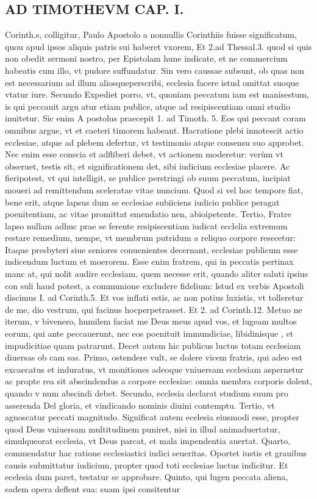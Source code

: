 \documentclass{article}
\begin{document}
\begin{pages}
\section*{AD TIMOTHEVM CAP. I. }
\marginpar{[ p.71 ]}\pstart Corinth.s, colligitur, Paulo Apostolo a nonnullis Corinthiis fuisse significatum, quou apud ipsos aliquis patris sui haberet vxorem, Et 2.ad Thessal.3. quod si quis non obedit sermoni nostro, per Epistolam hune indicate, et ne commercium habeatis cum illo, vt pudore suffundatur. Sin vero caussae subsunt, ob quas non est necessarium ad illum aliosqueperscribi, ecclesia facere istud omittat suoque vtatur iure. Secundo Expediet porro, vt, quoniam peccatum iam est manisestum, is qui peccauit argu atur etiam publice, atque ad resipiscentiam omni studio inuitetur. Sic enim A postolus praecepit 1. ad Timoth. 5. Eos qui peccant coram omnibus argue, vt et caeteri timorem habeant. Hacratione plebi innotescit actio ecclesiae, atque ad plebem defertur, vt testimonio atque consensu suo approbet. Nec enim esse conscia et adfliberi debet, vt actionem moderetur: verùm vt obseruet, testis sit, et significationem det, sibi iudicium ecclesiae placere. Ac fieripotest, vt qui intelligit, se publice perstringi ob suum peccatum, incipiat moueri ad remittendum sceleratae vitae nuncium. Quod si vel hoc tempore fiat, bene erit, atque lapsus dum se ecclesiae subiiciens iudicio publice peragat poenitentiam, ac vitae promittat emendatio nen, abioipetente.  \pend\pstart Tertio, Fratre lapso nullam adhuc prae se ferente resipiscentiam iudicat ecclelia extremum restare remedium, nempe, vt membrum putridum a reliquo corpore resecetur: Itaque  presbyteri siue seniores conuenientes decernant, ecclesiae publicum esse indicendum luctum et moerorem. Esse enim fratrem, qui in peccatis pertinax manc at, qui nolit audire ecclesiam, quem necesse erit, quando aliter saluti ipsius con suli haud potest, a communione excludere fidelium: lstud ex verbis Apostoli discimus I. ad Corinth.5. Et vos inflati estis, ac non potius luxistis, vt tolleretur de me, dio vestrum, qui facinus hocperpetrasset. Et 2. ad Corinth.12. Metuo ne iterum, v bivenero, humilem faciat me Deus meus apud vos, et lugeam multos eorum, qui ante peccauerunt, nec eos poenituit immundiciae, libidinisque , et impudicitiae quam patrarunt. Decet autem hic publicus luctus totam ecclesiam diuersas ob cam sas. Primo, ostendere vult, se dolere vicem fratris, qui adeo est excaecatus et induratus, vt monitiones adeoque vniuersam ecclesiam aspernetur ac propte rea sit abscindendus a corpore ecclesiae: omnia membra corporis dolent, quando v num abscindi debet. Secundo, ecclesia declarat studium suum pro asserenda Del gloria, et vindicando nominis diuini contemptu. Tertio, vt agnoscatur peccati magnitudo. Significat autem ecelesia eiusmodi esse, propter quod Deus vniuersam multitudinem puniret, nisi in illud animaduertatur, simulqueorat ecclesia, vt Deus parcat, et mala impendentia auertat. Quarto, commendatur hac ratione ecclesiastici iudici seueritas. Oportet iustis et grauibus  causis submittatur iudicium, propter quod toti ecclesiae luctus indicitur. Et ecelesia dum paret, testatur se approbare. Quinto, qui lugen peccata aliena, eadem opera deflent sua: suam ipsi consitentur 
\end{pages}
\end{document}
